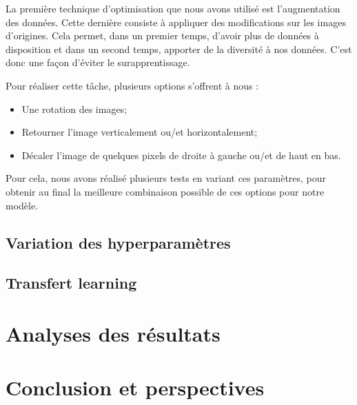 \documentclass[12pt,titlepage]{article}
\begin{document}
La première technique d'optimisation que nous avons utilisé est l'augmentation des données. Cette dernière consiste à appliquer des modifications sur les images d'origines. Cela permet, dans un premier temps, d'avoir plus de données à disposition et dans un second temps, apporter de la diversité à nos données. C'est donc une façon d'éviter le surapprentissage.

Pour réaliser cette tâche, plusieurs options s'offrent à nous :

\begin{itemize}
  \item Une rotation des images;
  \item Retourner l'image verticalement ou/et horizontalement;
  \item Décaler l'image de quelques pixels de droite à gauche ou/et de haut en bas.
\end{itemize}

Pour cela, nous avons réalisé plusieurs tests en variant ces paramètres, pour obtenir au final la meilleure combinaison possible de ces options pour notre modèle.



\subsection{Variation des hyperparamètres}

\subsection{Transfert learning}

\section{Analyses des résultats}

\section{Conclusion et perspectives}
\end{document}
